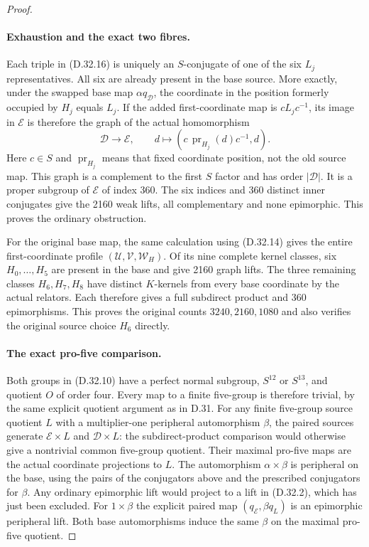 \begin{proof}
\paragraph{Exhaustion and the exact two fibres.}
Each triple in
\textup{(D.32.16)} is uniquely
an $S$-conjugate of one of
the six $L_j$ representatives.
All six are already present
in the base source.
More exactly, under the
swapped base map
$\alpha q_{\mathcal D}$,
the coordinate in the
position formerly occupied
by $H_j$ equals $L_j$.
If the added first-coordinate
map is $cL_jc^{-1}$, its
image in $\mathcal E$ is
therefore the graph of the
actual homomorphism
\[
 \mathcal D\longrightarrow\mathcal E,\qquad
       d\longmapsto
             (c\,\operatorname{pr}_{H_j}(d)c^{-1},d).
 \tag{D.32.17}
\]
Here $c\in S$ and
$\operatorname{pr}_{H_j}$
means that fixed coordinate
position, not the old source
map.
This graph is a complement
to the first $S$ factor and
has order $|\mathcal D|$.
It is a proper subgroup
of $\mathcal E$ of index
360.  The six indices and
360 distinct inner conjugates
give the 2160 weak lifts,
all complementary and none
epimorphic.  This proves
the ordinary obstruction.

For the original base map,
the same calculation using
\textup{(D.32.14)} gives the
entire first-coordinate profile
$(\mathcal U,\mathcal V,\mathcal W_H)$.
Of its nine complete kernel
classes, six $H_0,\ldots,H_5$
are present in the base and
give 2160 graph lifts.
The three remaining classes
$H_6,H_7,H_8$ have distinct
$K$-kernels from every base
coordinate by the actual
relators.  Each therefore
gives a full subdirect
product and 360 epimorphisms.
This proves the original
counts $3240,2160,1080$ and
also verifies the original
source choice $H_6$ directly.

\paragraph{The exact pro-five comparison.}
Both groups in
\textup{(D.32.10)} have a
perfect normal subgroup,
$S^{12}$ or $S^{13}$, and
quotient $O$ of order four.
Every map to a finite
five-group is therefore
trivial, by the same
explicit quotient argument
as in D.31.
For any finite five-group
source quotient $L$ with
a multiplier-one peripheral
automorphism $\beta$, the
paired sources generate
$\mathcal E\times L$ and
$\mathcal D\times L$:
the subdirect-product
comparison would otherwise
give a nontrivial common
five-group quotient.
Their maximal pro-five
maps are the actual
coordinate projections
to $L$.
The automorphism
$\alpha\times\beta$ is
peripheral on the base,
using the pairs of the
conjugators above and the
prescribed conjugators
for $\beta$.
Any ordinary epimorphic
lift would project to a
lift in
\textup{(D.32.2)}, which
has just been excluded.
For $1\times\beta$ the
explicit paired map
$(q_{\mathcal E},\beta q_L)$
is an epimorphic peripheral
lift.  Both base
automorphisms induce the
same $\beta$ on the
maximal pro-five quotient.


\end{proof}
